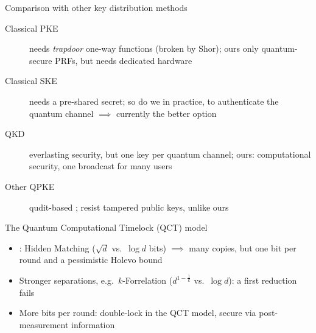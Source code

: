 \documentclass[aspectratio=169]{beamer}
\newcommand{\scite}[1]{{\tiny\citep{#1}}}
\begin{document}
\begin{frame}{Comparison with other key distribution methods}
	\begin{description}
		\item[Classical PKE] needs \emph{trapdoor} one-way functions (broken by Shor); ours only quantum-secure PRFs, but needs dedicated hardware
		\item[Classical SKE] needs a pre-shared secret; so do we in practice, to authenticate the quantum channel $\implies$ currently the better option
		\item[QKD] everlasting security, but one key per quantum channel; ours: computational security, one broadcast for many users
		\item[Other QPKE] qudit-based \scite{Bar+23,Col23,KTNY24,MW24}; \scite{KTNY24,MW24} resist tampered public keys, unlike ours
	\end{description}
\end{frame}

\begin{frame}{The Quantum Computational Timelock (QCT) model}
	\begin{center}
	\end{center}
	\begin{itemize}\small
		\item<4-> \citet{MBBA25}: Hidden Matching ($\sqrt{d}$ vs.\ $\log d$ bits) $\implies$ many copies, but one bit per round and a pessimistic Holevo bound
		\item<5-> Stronger separations, e.g.\ $k$-Forrelation ($d^{1-\frac1k}$ vs.\ $\log d$): a first reduction fails
		\item<6-> More bits per round: double-lock in the QCT model, secure via post-measurement information \scite{BWW08,GW10}
	\end{itemize}
\end{frame}
\end{document}
